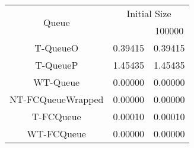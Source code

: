 \begin{tabular}{|c|c|c|}
\hline
\multirow{2}{*}{Queue} & \multicolumn{2}{c|}{Initial Size}\\\cline{2-3}& \qquad 10000 \qquad\quad & 100000\\
\hline
\hline
T-QueueO & 0.39415 & 0.39415\\
T-QueueP & 1.45435 & 1.45435\\
WT-Queue & 0.00000 & 0.00000\\
NT-FCQueueWrapped & 0.00000 & 0.00000\\
T-FCQueue & 0.00010 & 0.00010\\
WT-FCQueue & 0.00000 & 0.00000\\
\hline\end{tabular}
